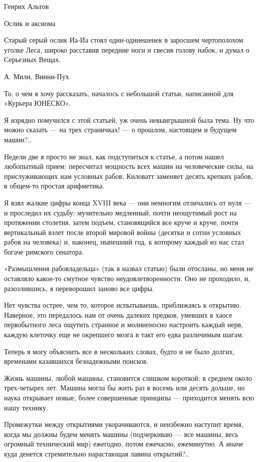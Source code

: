 
Генрих Альтов

Ослик и аксиома


Старый серый  ослик Иа-Иа  стоял один-одинешенек  в заросшем  чертополохом
уголке Леса, широко расставив передние ноги и свесив голову набок, и думал
о Серьезных Вещах.

А. Милн, Винни-Пух

То, о чем я хочу рассказать,  началось с небольшой статьи, написанной  для
«Курьера ЮНЕСКО».

Я изрядно помучился с  этой статьей, уж очень  невыигрышной была тема.  Ну
что можно сказать — на трех  страничках! — о прошлом, настоящем и  будущем
машин?..

Недели две я  просто не  знал, как подступиться  к статье,  а потом  нашел
любопытный прием: пересчитал мощность всех машин на человеческие силы,  на
прислуживающих нам условных рабов. Киловатт заменяет десять крепких рабов,
в общем-то простая арифметика.

Я взял жалкие цифры конца XVIII века — они немногим отличались от нуля — и
проследил их  судьбу:  мучительно  медленный,  почти  неощутимый  рост  на
протяжении столетия, затем подъем, становящийся  все круче и круче,  почти
вертикальный взлет после  второй мировой войны  (десятки и сотни  условных
рабов на человека) и, наконец, нынешний год, к которому каждый из нас стал
богаче римского сенатора.

«Размышления рабовладельца» (так я назвал  статью) были отосланы, но  меня
не  оставляло  какое-то  смутное   чувство  неудовлетворенности.  Оно   не
проходило, и, разозлившись, я переворошил заново все цифры.

Нет чувства острее, чем то,  которое испытываешь, приближаясь к  открытию.
Наверное, это передалось  нам от  очень далеких предков,  умевших в  хаосе
первобытного леса ощутить  странное и молниеносно  настроить каждый  нерв,
каждую клеточку еще не окрепшего мозга в такт его едва различимым шагам.

Теперь я могу объяснить все в  нескольких словах, будто и не было  долгих,
временами казавшихся безнадежными поисков.

Жизнь машины, любой машины, становится  слишком короткой: в среднем  около
трех-четырех лет. Машина могла бы жить раз в восемь или десять дольше,  но
наука открывает новые, более совершенные принципы — приходится менять  всю
нашу технику.

Промежутки между  открытиями укорачиваются,  и неизбежно  наступит  время,
когда мы  должны  будем менять  машины  (подчеркиваю —  все  машины,  весь
огромный технический мир)  ежегодно, потом ежечасно,  ежеминутно. А  иначе
куда денется стремительно нарастающая лавина открытий?..

